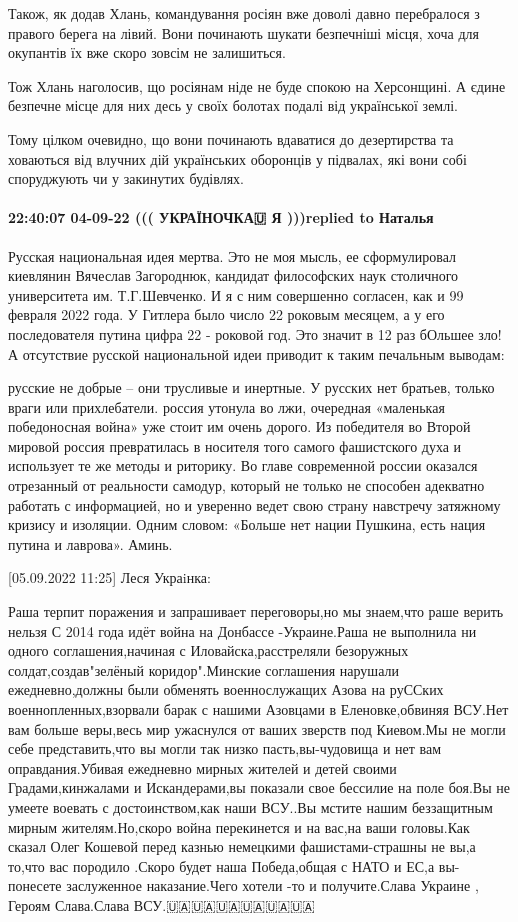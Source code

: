 Також, як додав Хлань, командування росіян вже доволі давно перебралося з
правого берега на лівий. Вони починають шукати безпечніші місця, хоча для
окупантів їх вже скоро зовсім не залишиться.

Тож Хлань наголосив, що росіянам ніде не буде спокою на Херсонщині. А єдине
безпечне місце для них десь у своїх болотах подалі від української землі.

Тому цілком очевидно, що вони починають вдаватися до дезертирства та ховаються
від влучних дій українських оборонців у підвалах, які вони собі споруджують чи
у закинутих будівлях.

\paragraph{22:40:07 04-09-22 ((( УКРАЇНОЧКА🇺 Я )))replied to Наталья}

Русская национальная идея мертва. Это не моя мысль, ее сформулировал киевлянин
Вячеслав Загороднюк, кандидат философских наук столичного университета им.
Т.Г.Шевченко. И я с ним совершенно согласен, как и 99%
февраля 2022 года. У Гитлера было число 22 роковым месяцем, а у его
последователя путина цифра 22 - роковой год. Это значит в 12 раз бОльшее зло! А
отсутствие русской национальной идеи приводит к таким печальным выводам:

русские не добрые – они трусливые и инертные. У русских нет братьев, только
враги или прихлебатели. россия утонула во лжи, очередная «маленькая
победоносная война» уже стоит им очень дорого. Из победителя во Второй мировой
россия превратилась в носителя того самого фашистского духа и использует те же
методы и риторику.  Во главе современной россии оказался отрезанный от
реальности самодур, который не только не способен адекватно работать с
информацией, но и уверенно ведет свою страну навстречу затяжному кризису и
изоляции. Одним словом: «Больше нет нации Пушкина, есть нация путина и
лаврова». Аминь.

[05.09.2022 11:25] Леся Украiнка: 

Раша терпит поражения и запрашивает переговоры,но мы знаем,что раше верить
нельзя С 2014 года идёт война на Донбассе -Украине.Раша не выполнила ни одного
соглашения,начиная с Иловайска,расстреляли безоружных солдат,создав"зелёный
коридор".Минские соглашения нарушали ежедневно,должны были обменять
военнослужащих Азова на руССких военнопленных,взорвали барак с нашими Азовцами
в Еленовке,обвиняя ВСУ.Нет вам больше веры,весь мир ужаснулся от ваших зверств
под Киевом.Мы не могли себе представить,что вы могли так низко
пасть,вы-чудовища и нет вам оправдания.Убивая ежедневно мирных жителей и детей
своими Градами,кинжалами и Искандерами,вы показали свое бессилие на поле боя.Вы
не умеете воевать с достоинством,как наши ВСУ..Вы мстите нашим беззащитным
мирным жителям.Но,скоро война перекинется и на вас,на ваши головы.Как сказал
Олег Кошевой перед казнью немецкими  фашистами-страшны не вы,а то,что вас
породило .Скоро будет наша Победа,общая с НАТО и ЕС,а вы-понесете  заслуженное
наказание.Чего хотели -то и получите.Слава Украине , Героям Слава.Слава
ВСУ.🇺🇦🇺🇦🇺🇦🇺🇦🇺🇦🇺🇦

